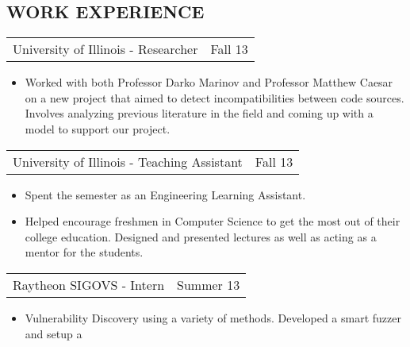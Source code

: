 \documentclass[margin]{res}
\begin{document}
\begin{resume}
\section{WORK EXPERIENCE}
\begin{tabular}{p{3in} r} %
                  University of Illinois - Researcher &  Fall 13
                  \end{tabular}
                   \begin{itemize} \itemsep -2pt %
                     \item Worked with both Professor Darko Marinov
                       and Professor Matthew Caesar on a new project
                       that aimed to detect incompatibilities between
                       code sources.  Involves analyzing previous
                       literature in the field and coming up with a
                       model to support our project.
		   \end{itemize}
\begin{tabular}{p{3in} r} %
                  University of Illinois - Teaching Assistant&  Fall 13
                  \end{tabular}
                   \begin{itemize} \itemsep -2pt %
                     \item Spent the semester as an Engineering Learning Assistant.
                     \item Helped encourage freshmen in Computer
                       Science to get the most out of their college
                       education.  Designed and presented lectures as
                       well as acting as a mentor for the students.
		   \end{itemize}
\begin{tabular}{p{3in} r} %
                  Raytheon SIGOVS - Intern &  Summer 13
                  \end{tabular}
                   \begin{itemize} \itemsep -2pt %
                    \item Vulnerability Discovery using a variety of
                      methods.  Developed a smart fuzzer and setup a

\end{itemize}
\end{resume}
\end{document}
